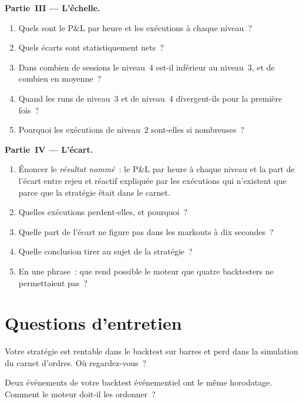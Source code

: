 \begin{problem}
\medskip\noindent\textbf{Partie~III --- L'échelle.}
\begin{enumerate}[resume]
\item Quels sont le P\&L par heure et les exécutions à chaque niveau~?
\item Quels écarts sont statistiquement nets~?
\item Dans combien de sessions le niveau~4 est-il inférieur au niveau~3, et de combien en moyenne~?
\item Quand les runs de niveau~3 et de niveau~4 divergent-ils pour la première fois~?
\item Pourquoi les exécutions de niveau~2 sont-elles si nombreuses~?
\end{enumerate}

\medskip\noindent\textbf{Partie~IV --- L'écart.}
\begin{enumerate}[resume]
\item Énoncer le \emph{résultat nommé}~: le P\&L par heure à chaque niveau et la part de l'écart entre rejeu et réactif expliquée par les exécutions
qui n'existent que parce que la stratégie était dans le carnet.
\item Quelles exécutions perdent-elles, et pourquoi~?
\item Quelle part de l'écart ne figure pas dans les markouts à dix secondes~?
\item Quelle conclusion tirer au sujet de la stratégie~?
\item En une phrase~: que rend possible le moteur que quatre backtesters ne permettaient pas~?
\end{enumerate}
\end{problem}

\section{Questions d'entretien}

\begin{interviewq}\label{iq:pl:backtest-engine-architecture:1}
Votre stratégie est rentable dans le backtest sur barres et perd dans la simulation du carnet d'ordres. Où regardez-vous~?
\end{interviewq}

\begin{interviewq}\label{iq:pl:backtest-engine-architecture:2}
Deux événements de votre backtest événementiel ont le même horodatage. Comment le moteur doit-il les ordonner~?
\end{interviewq}

